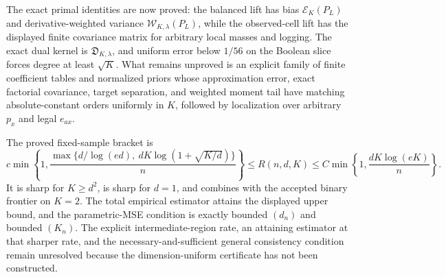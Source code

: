 The exact primal identities are now proved: the balanced lift has bias \(\mathcal E_K(P_L)\) and derivative-weighted variance \(\mathcal W_{K,\lambda}(P_L)\), while the observed-cell lift has the displayed finite covariance matrix for arbitrary local masses and logging.  The exact dual kernel is \(\mathfrak D_{K,\lambda}\), and uniform error below \(1/56\) on the Boolean slice forces degree at least \(\sqrt K\).  What remains unproved is an explicit family of finite coefficient tables and normalized priors whose approximation error, exact factorial covariance, target separation, and weighted moment tail have matching absolute-constant orders uniformly in \(K\), followed by localization over arbitrary \(p_x\) and legal \(e_{ax}\).

The proved fixed-sample bracket is
\[
 c\min\!\left\{1,\frac{\max\{d/\log(ed),\ dK\log(1+\sqrt{K/d})\}}{n}\right\}
 \leq R(n,d,K)
 \leq C\min\!\left\{1,\frac{dK\log(eK)}n\right\}.
\]
It is sharp for \(K\geq d^2\), is sharp for \(d=1\), and combines with the accepted binary frontier on \(K=2\).  The total empirical estimator attains the displayed upper bound, and the parametric-MSE condition is exactly bounded \((d_n)\) and bounded \((K_n)\).  The explicit intermediate-region rate, an attaining estimator at that sharper rate, and the necessary-and-sufficient general consistency condition remain unresolved because the dimension-uniform certificate has not been constructed.
